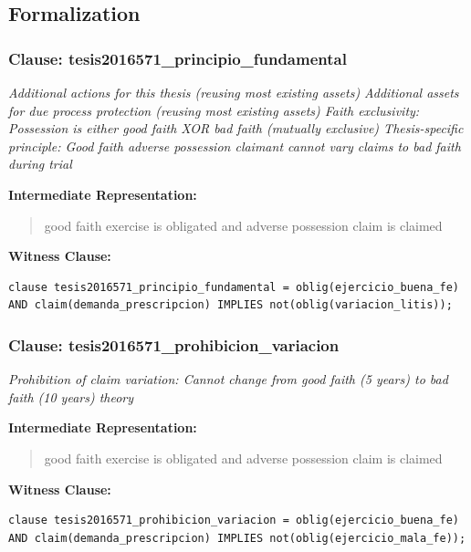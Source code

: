 \documentclass[11pt,a4paper]{article}
\begin{document}
\subsection{Formalization}

\subsubsection{Clause: tesis2016571\_principio\_fundamental}

\textit{Additional actions for this thesis (reusing most existing assets) Additional assets for due process protection (reusing most existing assets) Faith exclusivity: Possession is either good faith XOR bad faith (mutually exclusive) Thesis-specific principle: Good faith adverse possession claimant cannot vary claims to bad faith during trial}

\textbf{Intermediate Representation:}

\begin{quote}
good faith exercise is obligated and adverse possession claim is claimed
\end{quote}

\textbf{Witness Clause:}

\begin{lstlisting}[style=witnessstyle, language=Witness]
clause tesis2016571_principio_fundamental = oblig(ejercicio_buena_fe) AND claim(demanda_prescripcion) IMPLIES not(oblig(variacion_litis));
\end{lstlisting}

\subsubsection{Clause: tesis2016571\_prohibicion\_variacion}

\textit{Prohibition of claim variation: Cannot change from good faith (5 years) to bad faith (10 years) theory}

\textbf{Intermediate Representation:}

\begin{quote}
good faith exercise is obligated and adverse possession claim is claimed
\end{quote}

\textbf{Witness Clause:}

\begin{lstlisting}[style=witnessstyle, language=Witness]
clause tesis2016571_prohibicion_variacion = oblig(ejercicio_buena_fe) AND claim(demanda_prescripcion) IMPLIES not(oblig(ejercicio_mala_fe));
\end{lstlisting}
\end{document}
